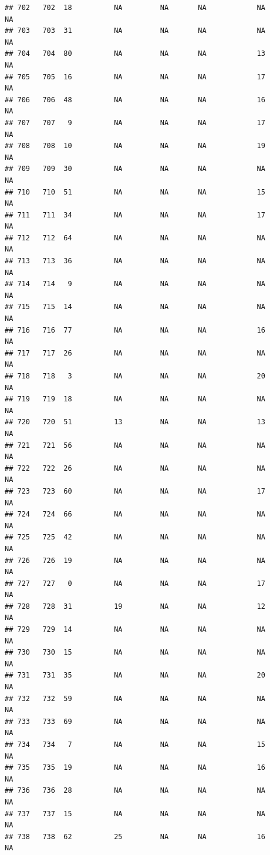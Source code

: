 \documentclass[man]{apa6}
\begin{document}
\begin{verbatim}
## 702   702  18          NA         NA       NA            NA       NA
## 703   703  31          NA         NA       NA            NA       NA
## 704   704  80          NA         NA       NA            13       NA
## 705   705  16          NA         NA       NA            17       NA
## 706   706  48          NA         NA       NA            16       NA
## 707   707   9          NA         NA       NA            17       NA
## 708   708  10          NA         NA       NA            19       NA
## 709   709  30          NA         NA       NA            NA       NA
## 710   710  51          NA         NA       NA            15       NA
## 711   711  34          NA         NA       NA            17       NA
## 712   712  64          NA         NA       NA            NA       NA
## 713   713  36          NA         NA       NA            NA       NA
## 714   714   9          NA         NA       NA            NA       NA
## 715   715  14          NA         NA       NA            NA       NA
## 716   716  77          NA         NA       NA            16       NA
## 717   717  26          NA         NA       NA            NA       NA
## 718   718   3          NA         NA       NA            20       NA
## 719   719  18          NA         NA       NA            NA       NA
## 720   720  51          13         NA       NA            13       NA
## 721   721  56          NA         NA       NA            NA       NA
## 722   722  26          NA         NA       NA            NA       NA
## 723   723  60          NA         NA       NA            17       NA
## 724   724  66          NA         NA       NA            NA       NA
## 725   725  42          NA         NA       NA            NA       NA
## 726   726  19          NA         NA       NA            NA       NA
## 727   727   0          NA         NA       NA            17       NA
## 728   728  31          19         NA       NA            12       NA
## 729   729  14          NA         NA       NA            NA       NA
## 730   730  15          NA         NA       NA            NA       NA
## 731   731  35          NA         NA       NA            20       NA
## 732   732  59          NA         NA       NA            NA       NA
## 733   733  69          NA         NA       NA            NA       NA
## 734   734   7          NA         NA       NA            15       NA
## 735   735  19          NA         NA       NA            16       NA
## 736   736  28          NA         NA       NA            NA       NA
## 737   737  15          NA         NA       NA            NA       NA
## 738   738  62          25         NA       NA            16       NA

\end{verbatim}
\end{document}
